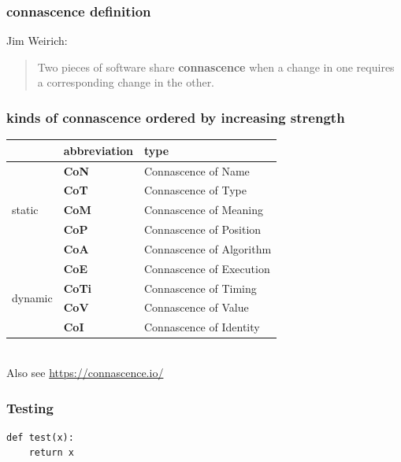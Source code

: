\documentclass[aspectratio=169,12pt,xcolor=dvipsnames]{beamer}
\begin{document}
\begin{frame}
  \frametitle{connascence definition}
  Jim Weirich:\bigskip\\
  \begin{quote}
    Two pieces of software share \textbf{connascence} when a change in one requires a corresponding change in the other.
  \end{quote}
\end{frame}

\begin{frame}
  \frametitle{kinds of connascence ordered by increasing strength}
  \begin{center}
    \begin{tabular}{|l|l|l|}\hline
      & \textbf{abbreviation}  & \textbf{type} \\\hline
      \multirow{5}{*}{static}  & \textbf{CoN}  & Connascence of Name\\
      & \textbf{CoT}  & Connascence of Type\\
      & \textbf{CoM}  & Connascence of Meaning\\
      & \textbf{CoP}  & Connascence of Position\\
      & \textbf{CoA}  & Connascence of Algorithm\\\hline
      \multirow{4}{*}{dynamic} & \textbf{CoE}  & Connascence of Execution\\
      & \textbf{CoTi} & Connascence of Timing\\
      & \textbf{CoV}  & Connascence of Value\\
      & \textbf{CoI}  & Connascence of Identity\\\hline
    \end{tabular}\\\bigskip
    Also see \url{https://connascence.io/}
  \end{center}
\end{frame}

\begin{frame}[fragile]
  \frametitle{Testing}
  \begin{center}
    \begin{minipage}[c]{.5\textwidth}
      \begin{verbatim}
def test(x):
    return x
      \end{verbatim}
    \end{minipage}
  \end{center}
\end{frame}


\end{document}
